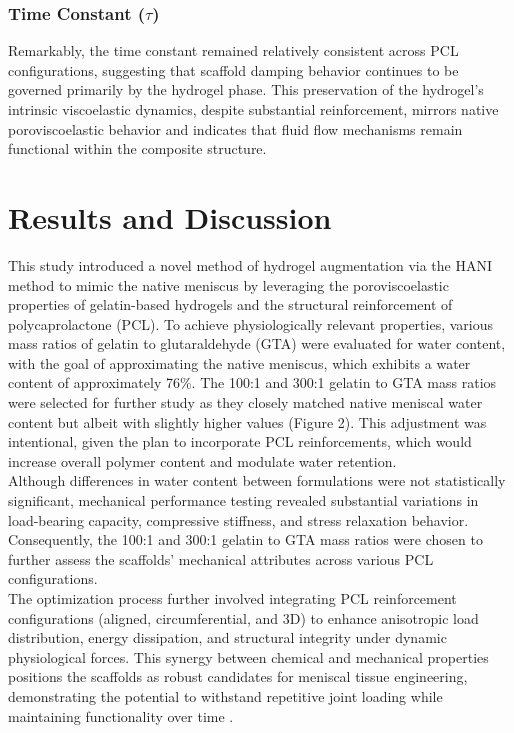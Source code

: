 \subsubsection{Time Constant ($\tau$)}
Remarkably, the time constant remained relatively consistent across PCL configurations, suggesting that scaffold damping behavior continues to be governed primarily by the hydrogel phase. This preservation of the hydrogel's intrinsic viscoelastic dynamics, despite substantial reinforcement, mirrors native poroviscoelastic behavior and indicates that fluid flow mechanisms remain functional within the composite structure.

\section{Results and Discussion}

This study introduced a novel method of hydrogel augmentation via the HANI method to mimic the native meniscus by leveraging the poroviscoelastic properties of gelatin-based hydrogels and the structural reinforcement of polycaprolactone (PCL). To achieve physiologically relevant properties, various mass ratios of gelatin to glutaraldehyde (GTA) were evaluated for water content, with the goal of approximating the native meniscus, which exhibits a water content of approximately 76\%. The 100:1 and 300:1 gelatin to GTA mass ratios were selected for further study as they closely matched native meniscal water content but albeit with slightly higher values (Figure 2). This adjustment was intentional, given the plan to incorporate PCL reinforcements, which would increase overall polymer content and modulate water retention.\\[0pt]

\indent Although differences in water content between formulations were not statistically significant, mechanical performance testing revealed substantial variations in load-bearing capacity, compressive stiffness, and stress relaxation behavior. Consequently, the 100:1 and 300:1 gelatin to GTA mass ratios were chosen to further assess the scaffolds' mechanical attributes across various PCL configurations.\\[0pt]

\indent The optimization process further involved integrating PCL reinforcement configurations (aligned, circumferential, and 3D) to enhance anisotropic load distribution, energy dissipation, and structural integrity under dynamic physiological forces. This synergy between chemical and mechanical properties positions the scaffolds as robust candidates for meniscal tissue engineering, demonstrating the potential to withstand repetitive joint loading while maintaining functionality over time \cite{norberg2021viscoelasticequilibrium}.

